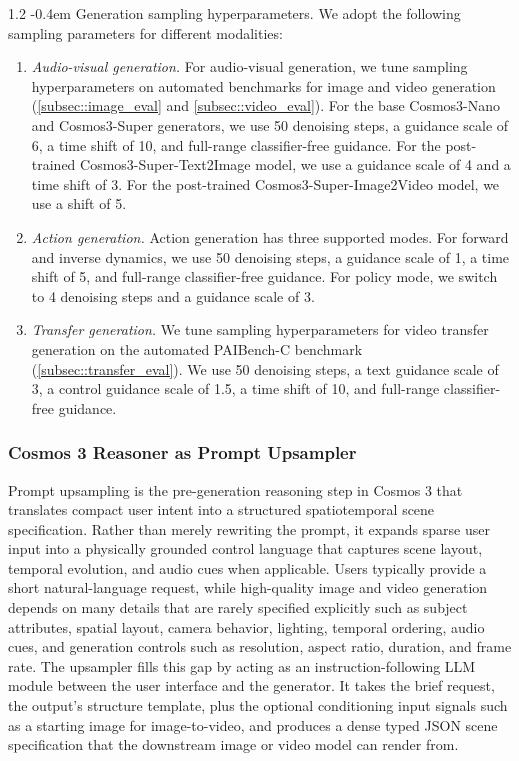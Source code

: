 \documentclass{llmxive}
\makeatletter
\providecommand{\paragraph}{  \@startsection{paragraph}{4}{\z@}    {1\baselineskip \@plus .2\baselineskip}    {-0.4em}    {\normalfont\normalsize\bfseries}}
\makeatother
\begin{document}
\paragraph{Generation sampling hyperparameters.} We adopt the following sampling parameters for different modalities:
\begin{enumerate}
    \item \textit{Audio-visual generation.} For audio-visual generation, we tune sampling hyperparameters on automated benchmarks for image and video generation (\cref{subsec::image_eval} and \cref{subsec::video_eval}). For the base Cosmos3-Nano and Cosmos3-Super generators, we use 50 denoising steps, a guidance scale of 6, a time shift of 10, and full-range classifier-free guidance. For the post-trained Cosmos3-Super-Text2Image model, we use a guidance scale of 4 and a time shift of 3. For the post-trained Cosmos3-Super-Image2Video model, we use a shift of 5.
    \item \textit{Action generation.} Action generation has three supported modes. For forward and inverse dynamics, we use 50 denoising steps, a guidance scale of 1, a time shift of 5, and full-range classifier-free guidance. For policy mode, we switch to 4 denoising steps and a guidance scale of 3.
    \item \textit{Transfer generation.} We tune sampling hyperparameters for video transfer generation on the automated PAIBench-C benchmark (\cref{subsec::transfer_eval}). We use 50 denoising steps, a text guidance scale of 3, a control guidance scale of 1.5, a time shift of 10, and full-range classifier-free guidance.
\end{enumerate}

\subsubsection{Cosmos 3 Reasoner as Prompt Upsampler}
\label{sec::prompt_upsampling}

Prompt upsampling is the pre-generation reasoning step in Cosmos 3 that translates compact user intent into a structured spatiotemporal scene specification. Rather than merely rewriting the prompt, it expands sparse user input into a physically grounded control language that captures scene layout, temporal evolution, and audio cues when applicable. Users typically provide a short natural-language request, while high-quality image and video generation depends on many details that are rarely specified explicitly such as subject attributes, spatial layout, camera behavior, lighting, temporal ordering, audio cues, and generation controls such as resolution, aspect ratio, duration, and frame rate. The upsampler fills this gap by acting as an instruction-following LLM module between the user interface and the generator. It takes the brief request, the output's structure template, plus the optional conditioning input signals such as a starting image for image-to-video, and produces a dense typed JSON scene specification that the downstream image or video model can render from.
\end{document}
